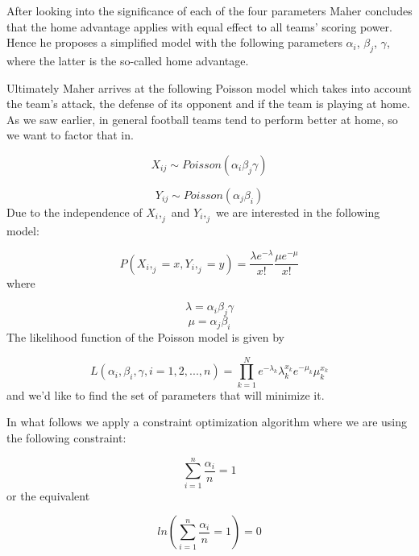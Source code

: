 \documentclass[
]{article}
\begin{document}
After looking into the significance of each of the four parameters Maher
concludes that the home advantage applies with equal effect to all
teams' scoring power. Hence he proposes a simplified model with the
following parameters \(\alpha_i\), \(\beta_j\), \(\gamma\), where the
latter is the so-called home advantage.

Ultimately Maher arrives at the following Poisson model which takes into
account the team's attack, the defense of its opponent and if the team
is playing at home. As we saw earlier, in general football teams tend to
perform better at home, so we want to factor that in.

\[
X_{ij} \sim Poisson(\alpha_i\beta_j\gamma)
\]

\[
Y_{ij}\sim Poisson(\alpha_j\beta_i)
\] Due to the independence of \(X_i,_j\) and \(Y_i,_j\) we are
interested in the following model:

\[
P(X_i,_j = x, Y_i,_j = y) = \frac{\lambda e^{-\lambda}}{x!}\frac{\mu e^{-\mu}}{x!}
\] where

\[
\lambda = \alpha_i\beta_j\gamma
\] \[
\mu = \alpha_j\beta_i
\] The likelihood function of the Poisson model is given by

\[
L(\alpha_i,\beta_i,\gamma,i = 1,2,...,n) = \prod_{k=1}^{N} e^{-\lambda_k}\lambda_k^{x_k} e^{-\mu_k}\mu_k^{x_k} 
\] and we'd like to find the set of parameters that will minimize it.

In what follows we apply a constraint optimization algorithm where we
are using the following constraint:

\[
\sum_{i=1}^n\frac{\alpha_i}{n}=1
\] or the equivalent

\[
ln(\sum_{i=1}^n\frac{\alpha_i}{n}=1) = 0
\]
\end{document}
